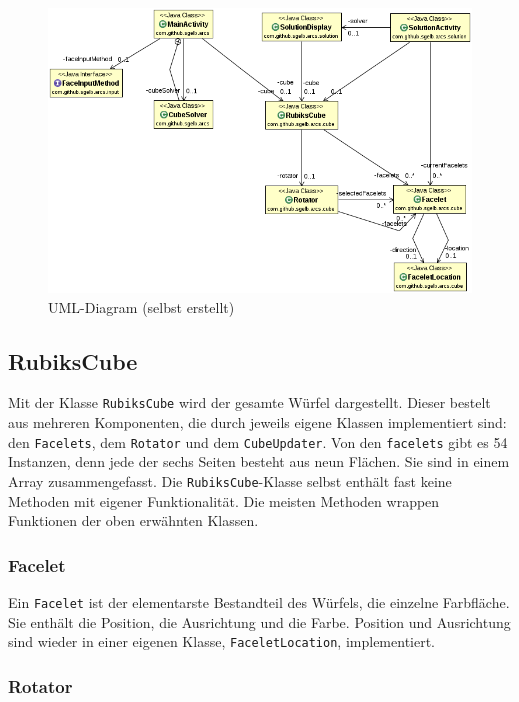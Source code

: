 \begin{figure}[ht!]
  \centering
  \includegraphics[width=\textwidth]{pics/uml.png}
  \caption{UML-Diagram (selbst erstellt)}
  \label{fig:uml}
\end{figure}


\subsection{RubiksCube}

Mit der Klasse \texttt{RubiksCube} wird der gesamte Würfel dargestellt. Dieser
bestelt aus mehreren Komponenten, die durch jeweils eigene Klassen implementiert
sind: den \texttt{Facelets}, dem \texttt{Rotator} und dem \texttt{CubeUpdater}.
Von den \texttt{facelets} gibt es 54 Instanzen, denn jede der sechs Seiten besteht
aus neun Flächen. Sie sind in einem Array zusammengefasst. Die
\texttt{RubiksCube}-Klasse selbst enthält fast keine Methoden mit eigener
Funktionalität. Die meisten Methoden wrappen Funktionen der oben erwähnten
Klassen. 

\subsubsection{Facelet}

Ein \texttt{Facelet} ist der elementarste Bestandteil des Würfels, die einzelne
Farbfläche. Sie enthält die Position, die Ausrichtung und die Farbe. Position und
Ausrichtung sind wieder in einer eigenen Klasse, \texttt{FaceletLocation},
implementiert.

\subsubsection{Rotator}


